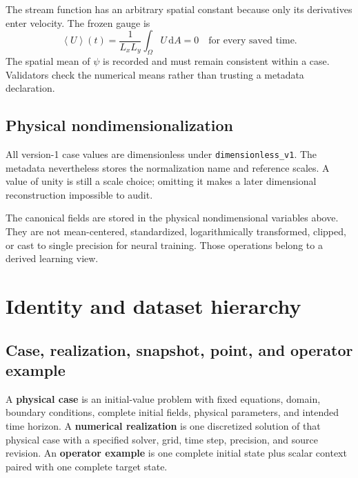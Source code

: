 \documentclass[11pt]{article}
\newcommand{\average}[1]{\left\langle #1\right\rangle}
\newcommand{\code}[1]{\texttt{#1}}
\begin{document}
The stream function has an arbitrary spatial constant because only its derivatives enter velocity. The frozen gauge is
\begin{equation}
\average{U}(t)=\frac{1}{L_xL_y}\int_\Omega U\,\mathrm dA=0
\quad\text{for every saved time.}
\end{equation}
The spatial mean of $\psi$ is recorded and must remain consistent within a case. Validators check the numerical means rather than trusting a metadata declaration.

\subsection{Physical nondimensionalization}

All version-1 case values are dimensionless under \code{dimensionless\_v1}. The metadata nevertheless stores the normalization name and reference scales. A value of unity is still a scale choice; omitting it makes a later dimensional reconstruction impossible to audit.

\begin{warningbox}
The canonical fields are stored in the physical nondimensional variables above. They are not mean-centered, standardized, logarithmically transformed, clipped, or cast to single precision for neural training. Those operations belong to a derived learning view.
\end{warningbox}

\section{Identity and dataset hierarchy}
\label{sec:identity}

\subsection{Case, realization, snapshot, point, and operator example}

\begin{definitionbox}
A \textbf{physical case} is an initial-value problem with fixed equations, domain, boundary conditions, complete initial fields, physical parameters, and intended time horizon. A \textbf{numerical realization} is one discretized solution of that physical case with a specified solver, grid, time step, precision, and source revision. An \textbf{operator example} is one complete initial state plus scalar context paired with one complete target state.
\end{definitionbox}
\end{document}
